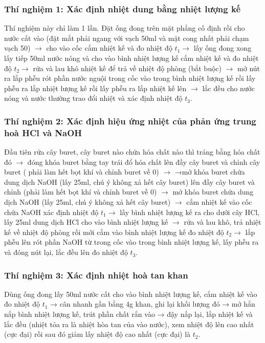 \documentclass[12pt]{article}
\begin{document}
\subsubsection{Thí nghiệm 1: Xác định nhiệt dung bằng nhiệt lượng kế}
Thí nghiệm này chỉ làm 1 lần.
Đặt ống đong trên mặt phẳng cố định rồi cho nước cất vào (đặt mắt phải ngang
với vạch 50ml và mặt cong nhất phải chạm vạch 50) $\rightarrow$ cho vào cốc cắm nhiệt
kế và đo nhiệt độ $t_1 \rightarrow$ lấy ống đong xong lấy tiếp 50ml nước nóng và cho vào bình nhiệt lượng kế cắm nhiệt kế và đo nhiệt độ $t_2 \rightarrow$ rửa và lau khô nhiệt kế để trả về nhiệt độ phòng (bắt buộc) $\rightarrow$ mở nút ra lắp phễu rót phần nước nguội trong cốc vào trong bình nhiệt lượng kế rồi lấy phễu ra lắp nhiệt lượng kế rồi lấy phễu ra lắp nhiệt kế lên $\rightarrow$ lắc đều cho nước nóng và nước thường trao đổi nhiệt và xác định nhiệt độ $t_3$.
\subsubsection{Thí nghiệm 2: Xác định hiệu ứng nhiệt của phản ứng trung hoà HCl và NaOH}
Đầu tiên rửa cây buret, cây buret nào chứa hóa chất nào thì tráng bằng hóa chất
đó $\rightarrow$ đóng khóa buret bằng tay trái đổ hóa chất lên đầy cây buret và chỉnh cây buret ( phải làm hết bọt khí và chỉnh buret về 0) $\rightarrow$ →mở khóa buret chứa dung dịch NaOH (lấy 25ml, chú ý không xả hết cây buret) lên đầy cây buret và chỉnh (phải làm hết bọt khí và chỉnh buret về 0) $\rightarrow$ mở khóa buret chứa dung dịch NaOH (lấy 25ml, chú ý không xả hết cây buret) $\rightarrow$ cắm nhiệt kế vào cốc chứa NaOH xác định nhiệt độ $t_1 \rightarrow$ lấy bình nhiệt lượng kế ra cho dưới cây HCl, lấy 25ml dung dịch HCl cho vào bình nhiệt lượng kế $\rightarrow$ rửa và lau khô, trả nhiệt kế về nhiệt độ phòng rồi mới cắm vào bình nhiệt lượng kế đo nhiệt độ $t_2 \rightarrow$ lắp phễu lên rót phần NaOH từ trong cốc vào trong bình nhiệt lượng kế, lấy phễu ra và đóng nút lại, lắc đều lên đo nhiệt độ $t_3$.
\subsubsection{Thí nghiệm 3: Xác định nhiệt hoà tan  khan}
Dùng ống đong lấy 50ml nước cất cho vào bình nhiệt lượng kế, cắm nhiệt kế
vào đo nhiệt độ $t_1$ → cân nhanh gần bằng 4g  khan, ghi lại khối lượng
đó → mở hẳn nắp bình nhiệt lượng kế, trút phần chất rắn vào → đậy nắp lại, lắp nhiệt kế và lắc đều (nhiệt tỏa ra là nhiệt hòa tan của  vào nước), xem
nhiệt độ lên cao nhất (cực đại) rồi sau đó giảm lấy nhiệt độ cao nhất (cực đại) là
$t_2$.
\end{document}
